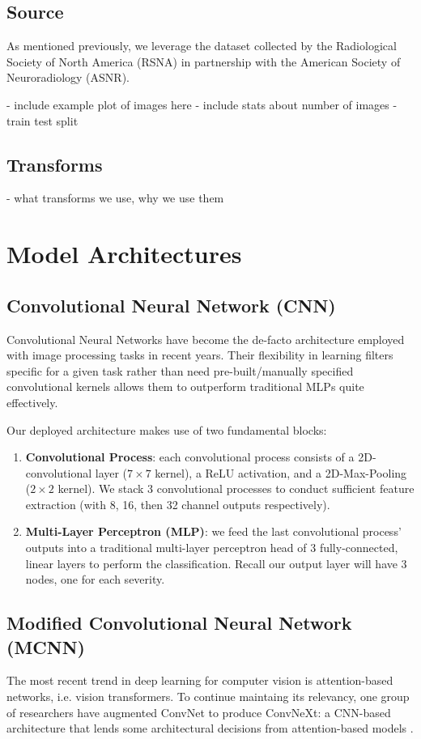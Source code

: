 \documentclass[conference]{IEEEtran}
\begin{document}
\subsection{Source}
As mentioned previously, we leverage the dataset collected by the Radiological Society of North America (RSNA) in partnership with the American Society of Neuroradiology (ASNR).

- include example plot of images here
- include stats about number of images
- train test split

\subsection{Transforms}
- what transforms we use, why we use them


\section{Model Architectures}
\subsection{Convolutional Neural Network (CNN)}
Convolutional Neural Networks have become the de-facto architecture employed with image processing tasks in recent years. Their flexibility in learning filters specific for a given task rather than need pre-built/manually specified convolutional kernels allows them to outperform traditional MLPs quite effectively.

Our deployed architecture makes use of two fundamental blocks:
\begin{enumerate}
    \item \textbf{Convolutional Process}: each convolutional process
    consists of a 2D-convolutional layer ($7 \times 7$ kernel), a ReLU activation, and a 2D-Max-Pooling ($2 \times 2$ kernel). We stack 3 convolutional processes to conduct sufficient feature extraction (with 8, 16, then 32 channel outputs respectively).
    
    \item \textbf{Multi-Layer Perceptron (MLP)}: we feed the last convolutional process' outputs into a traditional multi-layer perceptron head of 3 fully-connected, linear layers to perform the classification. Recall our output layer will have 3 nodes, one for each severity.
\end{enumerate}

\subsection{Modified Convolutional Neural Network (MCNN)}
The most recent trend in deep learning for computer vision is attention-based networks, i.e. vision transformers. To continue maintaing its relevancy, one group of researchers have augmented ConvNet to produce ConvNeXt: a CNN-based architecture that lends some architectural decisions from attention-based models \cite{convnet}. 
\end{document}

